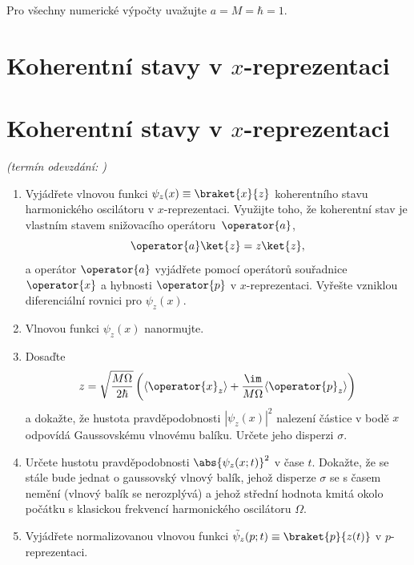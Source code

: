 \documentclass[a4paper,11pt,twoside]{book}
\def\np{\newpage}
\newcommand{\exercise}[2][]{\ifthenelse{\isempty{#1}}
	{\np\section{#2}}
	{\np\section{#2}\small{\it{(termín odevzdání: {#1})}\newline}}
}
\begin{document}
    Pro všechny numerické výpočty uvažujte $a=M=\hbar=1$.

\exercise{Koherentní stavy v $x$-reprezentaci}
    \begin{enumerate}
    \item 
        Vyjádřete vlnovou funkci $\psi_{z}(x)\equiv\braket{x}{z}$ koherentního stavu harmonického oscilátoru v $x$-reprezentaci.
        Využijte toho, že koherentní stav je vlastním stavem snižovacího operátoru~$\operator{a}$,
        \begin{equation*}
            \operator{a}\ket{z}=z\ket{z},
        \end{equation*}
        a operátor $\operator{a}$ vyjádřete pomocí operátorů souřadnice $\operator{x}$ a hybnosti $\operator{p}$ v $x$-reprezentaci.
        Vyřešte vzniklou diferenciální rovnici pro $\psi_{z}(x)$.

    \item Vlnovou funkci $\psi_{z}(x)$ nanormujte.

    \item 
        Dosaďte 
        \begin{equation*}
            z=\sqrt{\frac{M\Omega}{2\hbar}}\left(\langle\operator{x}_{z}\rangle+\frac{\im}{M\Omega}\langle\operator{p}_{z}\rangle\right)
        \end{equation*}
        a dokažte, že hustota pravděpodobnosti $|\psi_{z}(x)|^{2}$ nalezení částice v bodě $x$ odpovídá Gaussovskému vlnovému balíku.
        Určete jeho disperzi $\sigma$.

    \item 
        Určete hustotu pravděpodobnosti $\abs{\psi_{z}(x;t)}^2$ v čase $t$.
        Dokažte, že se stále bude jednat o gaussovský vlnový balík, jehož disperze $\sigma$ se s časem nemění (vlnový balík se nerozplývá) a jehož střední hodnota kmitá okolo počátku s klasickou frekvencí harmonického oscilátoru $\Omega$.
        
    \item
        Vyjádřete normalizovanou vlnovou funkci $\tilde{\psi}_{z}(p;t)\equiv\braket{p}{z(t)}$ v $p$-reprezentaci.

    \end{enumerate}
\end{document}
